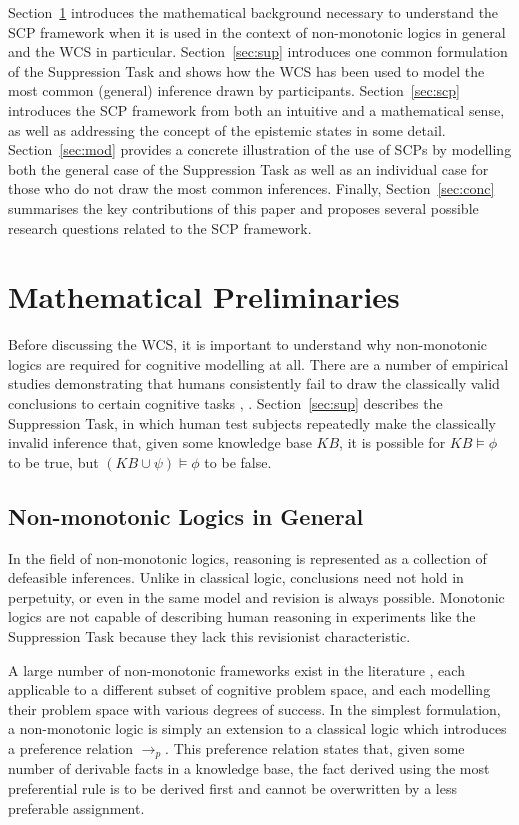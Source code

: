 \documentclass{article}
\begin{document}
Section~\ref{sec:matPrem} introduces the mathematical background necessary to understand the SCP framework when it is used in the context of non-monotonic logics in general and the WCS in particular. Section~\ref{sec:sup} introduces one common formulation of the Suppression Task and shows how the WCS has been used to model the most common (general) inference drawn by participants. Section~\ref{sec:scp} introduces the SCP framework from both an intuitive and a mathematical sense, as well as addressing the concept of the epistemic states in some detail. Section~\ref{sec:mod} provides a concrete illustration of the use of SCPs by modelling both the general case of the Suppression Task as well as an individual case for those who do not draw the most common inferences. Finally, Section~\ref{sec:conc} summarises the key contributions of this paper and proposes several possible research questions related to the SCP framework.


\section{Mathematical Preliminaries}\label{sec:matPrem}
Before discussing the WCS, it is important to understand why non-monotonic logics are required for cognitive modelling at all. There are a number of empirical studies demonstrating that humans consistently fail to draw the classically valid conclusions to certain cognitive tasks \citep{byrne1989suppressing}, \citep{wason1968reasoning}. Section~\ref{sec:sup} describes the Suppression Task, in which human test subjects repeatedly make the classically invalid inference that, given some knowledge base $KB$, it is possible for $KB \models \phi$ to be true, but $(KB \cup \psi) \models \phi$ to be false.

\subsection{Non-monotonic Logics in General}
In the field of non-monotonic logics, reasoning is represented as a collection of defeasible inferences. Unlike in classical logic, conclusions need not hold in perpetuity, or even in the same model and revision is always possible. Monotonic logics are not capable of describing human reasoning in experiments like the Suppression Task \citep{dietz2012computational} because they lack this revisionist characteristic.

A large number of non-monotonic frameworks exist in the literature \citep{mcdermott1980non}, each applicable to a different subset of cognitive problem space, and each modelling their problem space with various degrees of success. In the simplest formulation, a non-monotonic logic is simply an extension to a classical logic which introduces a preference relation $\rightarrow_p$. This preference relation states that, given some number of derivable facts in a knowledge base, the fact derived using the most preferential rule is to be derived first and cannot be overwritten by a less preferable assignment.  
\end{document}
